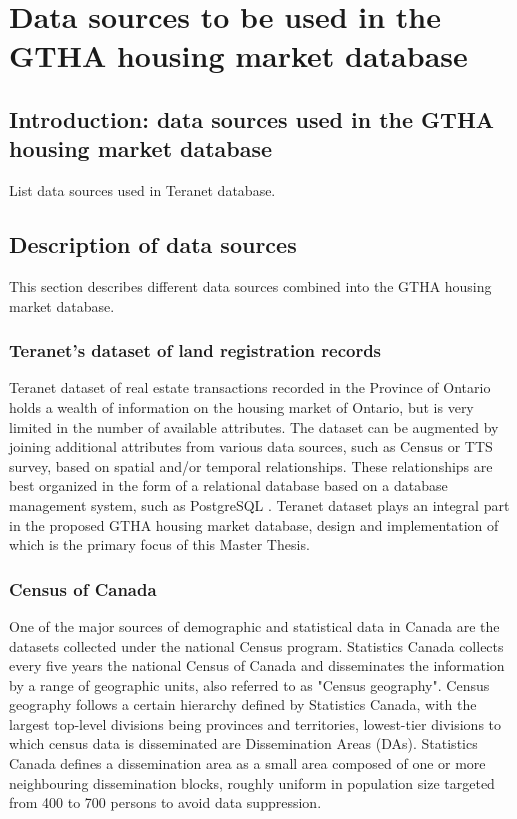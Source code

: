 \chapter{Data sources to be used in the GTHA housing market database} \label{ch:description_of_data_sources}

\section{Introduction: data sources used in the GTHA housing market database} \label{sec:intro_data_sources}

List data sources used in Teranet database.

\section{Description of data sources} \label{sec:description_of_data_sources}

This section describes different data sources combined into the GTHA housing market database.

\subsection{Teranet's dataset of land registration records} \label{subsec:teranet_description}

Teranet dataset of real estate transactions recorded in the Province of Ontario holds a wealth of information on the housing market of Ontario, but is very limited in the number of available attributes.
The dataset can be augmented by joining additional attributes from various data sources, such as Census or TTS survey, based on spatial and/or temporal relationships.
These relationships are best organized in the form of a relational database based on a database management system, such as PostgreSQL .
Teranet dataset plays an integral part in the proposed GTHA housing market database, design and implementation of which is the primary focus of this Master Thesis.

\subsection{Census of Canada} \label{subsec:census_description}

One of the major sources of demographic and statistical data in Canada are the datasets collected under the national Census program.
Statistics Canada collects every five years the national Census of Canada and disseminates the information by a range of geographic units, also referred to as "Census geography"\cite{MapandDataLibrary2019}.
Census geography follows a certain hierarchy defined by Statistics Canada, with the largest top-level divisions being provinces and territories, lowest-tier divisions to which census data is disseminated are Dissemination Areas (DAs)\cite{StatisticsCanada2018}.
Statistics Canada defines a dissemination area as a small area composed of one or more neighbouring dissemination blocks, roughly uniform in population size targeted from 400 to 700 persons to avoid data suppression\cite{StatisticsCanada2015}.

